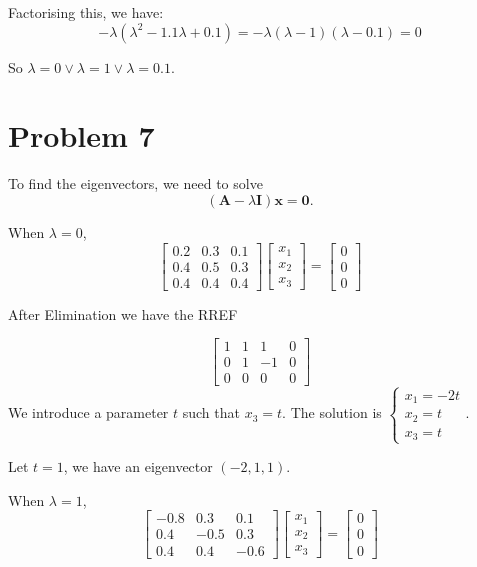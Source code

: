 \documentclass[12pt,a4paper]{article}
\begin{document}
Factorising this, we have:
\[
-\lambda(\lambda^2 - 1.1\lambda + 0.1) = -\lambda(\lambda - 1)(\lambda - 0.1) = 0
\]

So \(\lambda = 0 \lor \lambda = 1 \lor \lambda = 0.1\).


\section*{Problem 7}
\begin{solution}
To find the eigenvectors, we need to solve
\[
(\mathbf{A} - \lambda \mathbf{I})\mathbf{x} = \mathbf{0}.
\]

When $\lambda = 0$,
$$
\left[\begin{array}{ccc}
0.2 & 0.3 & 0.1 \\
0.4 & 0.5 & 0.3 \\
0.4 & 0.4 & 0.4
\end{array}\right]\left[\begin{array}{l}
x_1 \\
x_2 \\
x_3
\end{array}\right]=\left[\begin{array}{l}
0 \\
0 \\
0
\end{array}\right]
$$

After Elimination we have the RREF

\[
\left[\begin{array}{ccc|c}
1 & 1 & 1 & 0 \\
0 & 1 & -1& 0\\
0 & 0 & 0 & 0
\end{array}
\right]
\]
We introduce a parameter $t$ such that $x_3 = t$.
The solution is 
$\begin{cases}
x_1 = -2t\\
x_2 = t\\
x_3 = t
\end{cases}$.

Let $t = 1$, we have an eigenvector $(-2, 1, 1)$.


When $\lambda = 1$,
$$
\left[\begin{array}{ccc}
-0.8 & 0.3 & 0.1 \\
0.4 & -0.5 & 0.3 \\
0.4 & 0.4 & -0.6
\end{array}\right]\left[\begin{array}{l}
x_1 \\
x_2 \\
x_3
\end{array}\right]=\left[\begin{array}{l}
0 \\
0 \\
0
\end{array}\right]
$$


\end{solution}
\end{document}
